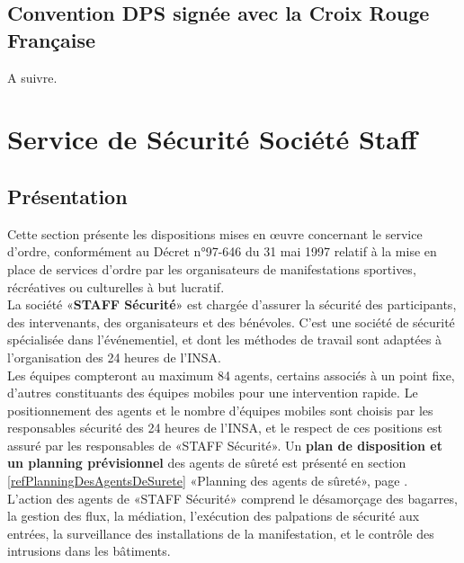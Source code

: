 \documentclass[hidelinks, paper=a4, fontsize=13pt]{report}
\begin{document}
\subsection{Convention DPS signée avec la Croix Rouge Française}
A suivre.


\section{Service de Sécurité Société Staff}
\subsection{Présentation}
Cette section présente les dispositions mises en œuvre concernant le service d’ordre, conformément au Décret n°97-646 du 31 mai 1997 relatif à la mise en place de services d’ordre par les organisateurs de manifestations sportives, récréatives ou culturelles à but lucratif.\\

La société «\textbf{STAFF Sécurité}» est chargée d’assurer la sécurité des participants, des intervenants, des organisateurs et des bénévoles. C’est une société de sécurité spécialisée dans l’événementiel, et dont les méthodes de travail sont adaptées à l’organisation des 24 heures de l'INSA.\\

Les équipes compteront au maximum 84 agents, certains associés à un point fixe, d’autres constituants des équipes mobiles pour une intervention rapide. Le positionnement des agents et le nombre d’équipes mobiles sont choisis par les responsables sécurité des 24 heures de l'INSA, et le respect de ces positions est assuré par les responsables de «STAFF Sécurité». Un \textbf{plan de disposition et un planning prévisionnel} des agents de sûreté est présenté en section \ref{refPlanningDesAgentsDeSurete} «Planning des agents de sûreté», page \pageref{refPlanningDesAgentsDeSurete}. \\

L’action des agents de  «STAFF Sécurité» comprend le désamorçage des bagarres, la gestion des flux, la médiation, l’exécution des palpations de sécurité aux entrées, la surveillance des installations de la manifestation, et le contrôle des intrusions dans les bâtiments.\\
\end{document}
